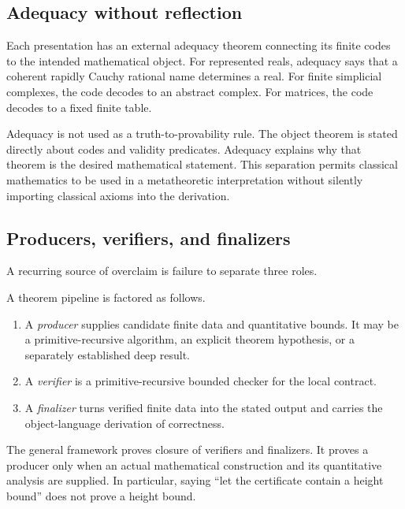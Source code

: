 \subsection{Adequacy without reflection}

Each presentation has an external adequacy theorem connecting its finite codes
to the intended mathematical object.  For represented reals, adequacy says
that a coherent rapidly Cauchy rational name determines a real.  For finite
simplicial complexes, the code decodes to an abstract complex.  For matrices,
the code decodes to a fixed finite table.

Adequacy is not used as a truth-to-provability rule.  The object theorem is
stated directly about codes and validity predicates.  Adequacy explains why
that theorem is the desired mathematical statement.  This separation permits
classical mathematics to be used in a metatheoretic interpretation without
silently importing classical axioms into the derivation.

\subsection{Producers, verifiers, and finalizers}

A recurring source of overclaim is failure to separate three roles.

\begin{definition}
A theorem pipeline is factored as follows.
\begin{enumerate}
\item A \emph{producer} supplies candidate finite data and quantitative bounds.
It may be a primitive-recursive algorithm, an explicit theorem hypothesis, or a
separately established deep result.
\item A \emph{verifier} is a primitive-recursive bounded checker for the local
contract.
\item A \emph{finalizer} turns verified finite data into the stated output and
carries the object-language derivation of correctness.
\end{enumerate}
\end{definition}

The general framework proves closure of verifiers and finalizers.  It proves a
producer only when an actual mathematical construction and its quantitative
analysis are supplied.  In particular, saying ``let the certificate contain a
height bound'' does not prove a height bound.
